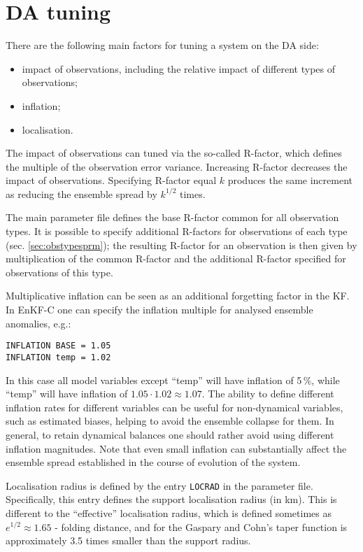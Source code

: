 \documentclass[11pt]{report}
\begin{document}
\section{DA tuning}
\label{sec:datuning}

There are the following main factors for tuning a system on the DA side:
\begin{itemize}
\item impact of observations, including the relative impact of different types of observations;
\item inflation;
\item localisation.
\end{itemize}

The impact of observations can tuned via the so-called R-factor, which defines the multiple of the observation error variance.
Increasing R-factor decreases the impact of observations.
Specifying R-factor equal $k$ produces the same increment as reducing the ensemble spread by $k^{1/2}$ times.

The main parameter file defines the base R-factor common for all observation types.
It is possible to specify additional R-factors for observations of each type (sec. \ref{sec:obstypesprm}); the resulting R-factor for an observation is then given by multiplication of the common R-factor and the additional R-factor specified for observations of this type.

Multiplicative inflation can be seen as an additional forgetting factor in the KF.
In EnKF-C one can specify the inflation multiple for analysed ensemble anomalies, e.g.:
\begin{Verbatim}[frame=single,fontsize=\footnotesize]
INFLATION BASE = 1.05
INFLATION temp = 1.02
\end{Verbatim}
In this case all model variables except ``temp'' will have inflation of 5\,\%, while ``temp'' will have inflation of $1.05 \cdot 1.02 \approx 1.07$.
The ability to define different inflation rates for different variables can be useful for non-dynamical variables, such as estimated biases, helping to avoid the ensemble collapse for them.
In general, to retain dynamical balances one should rather avoid using different inflation magnitudes.
Note that even small inflation can substantially affect the ensemble spread established in the course of evolution of the system.

Localisation radius is defined by the entry \verb|LOCRAD| in the parameter file.
Specifically, this entry defines the support localisation radius (in km).
This is different to the ``effective'' localisation radius, which is defined sometimes as $e^{1/2}\approx 1.65$ - folding distance, and for the Gaspary and Cohn's taper function is approximately 3.5 times smaller than the support radius.
\end{document}
